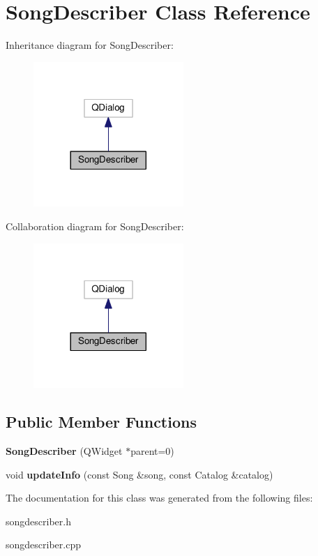 \hypertarget{class_song_describer}{}\section{Song\+Describer Class Reference}
\label{class_song_describer}


Inheritance diagram for Song\+Describer\+:
\nopagebreak
\begin{figure}[H]
\begin{center}
\leavevmode
\includegraphics[width=161pt]{class_song_describer__inherit__graph}
\end{center}
\end{figure}


Collaboration diagram for Song\+Describer\+:
\nopagebreak
\begin{figure}[H]
\begin{center}
\leavevmode
\includegraphics[width=161pt]{class_song_describer__coll__graph}
\end{center}
\end{figure}
\subsection*{Public Member Functions}
\begin{DoxyCompactItemize}
\item 
{\bfseries Song\+Describer} (Q\+Widget $\ast$parent=0)\hypertarget{class_song_describer_a9350e24e4c32132e1075e88f3ff45466}{}\label{class_song_describer_a9350e24e4c32132e1075e88f3ff45466}

\item 
void {\bfseries update\+Info} (const Song \&song, const Catalog \&catalog)\hypertarget{class_song_describer_ad21d4bf2bd9eb5b75f1f9162c37185d8}{}\label{class_song_describer_ad21d4bf2bd9eb5b75f1f9162c37185d8}

\end{DoxyCompactItemize}


The documentation for this class was generated from the following files\+:\begin{DoxyCompactItemize}
\item 
songdescriber.\+h\item 
songdescriber.\+cpp\end{DoxyCompactItemize}
